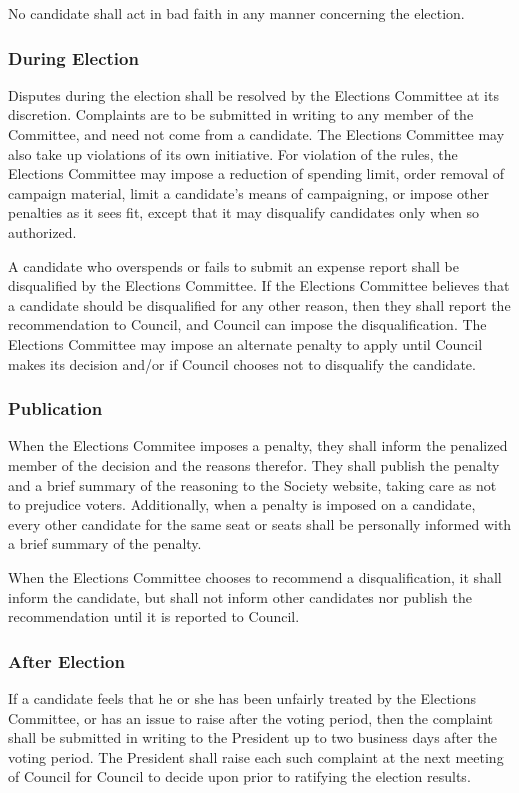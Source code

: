 No candidate shall act in bad faith in any manner concerning the election.

\subsubsection{During Election}
Disputes during the election shall be resolved by the Elections Committee at its
discretion. Complaints are to be submitted in writing to any member of the
Committee, and need not come from a candidate. The Elections Committee may also
take up violations of its own initiative. For violation of the rules, the
Elections Committee may impose a reduction of spending limit, order removal of
campaign material, limit a candidate's means of campaigning, or impose other
penalties as it sees fit, except that it may disqualify candidates only when so
authorized.

A candidate who overspends or fails to submit an expense report shall be
disqualified by the Elections Committee. If the Elections Committee believes
that a candidate should be disqualified for any other reason, then they shall
report the recommendation to Council, and Council can impose the
disqualification. The Elections Committee may impose an alternate penalty to
apply until Council makes its decision and/or if Council chooses not to
disqualify the candidate.

\subsubsection{Publication}
When the Elections Commitee imposes a penalty, they shall inform the penalized
member of the decision and the reasons therefor. They shall publish the penalty
and a brief summary of the reasoning to the Society website, taking care as not
to prejudice voters.  Additionally, when a penalty is imposed on a candidate,
every other candidate for the same seat or seats shall be personally informed
with a brief summary of the penalty.

When the Elections Committee chooses to recommend a disqualification, it shall
inform the candidate, but shall not inform other candidates nor publish the
recommendation until it is reported to Council.

\subsubsection{After Election}
If a candidate feels that he or she has been unfairly treated by the Elections
Committee, or has an issue to raise after the voting period, then the complaint
shall be submitted in writing to the President up to two business days after the
voting period. The President shall raise each such complaint at the next meeting
of Council for Council to decide upon prior to ratifying the election results.

